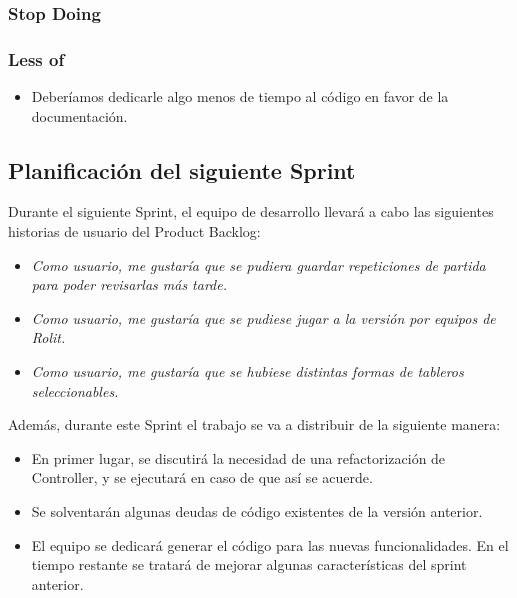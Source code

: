 \documentclass[../../FINAL/Scrum/SCRUM.tex]{subfiles}
\begin{document}
\subsubsection*{Stop Doing}


\subsubsection*{Less of}
\begin{itemize}
\item Deberíamos dedicarle algo menos de tiempo al código en favor de la documentación.
\end{itemize}

\subsection{Planificación del siguiente Sprint}
Durante el siguiente Sprint, el equipo de desarrollo llevará a cabo las siguientes historias de usuario del Product Backlog:
\begin{itemize}
\item \textit{Como usuario, me gustaría que se pudiera guardar repeticiones de partida para poder revisarlas más tarde.}
\item \textit{Como usuario, me gustaría que se pudiese jugar a la versión por equipos de Rolit.}
\item \textit{Como usuario, me gustaría que se hubiese distintas formas de tableros seleccionables.}
\end{itemize}
Además, durante este Sprint el trabajo se va a distribuir de la siguiente manera:
\begin{itemize}
\item En primer lugar, se discutirá la necesidad de una refactorización de Controller, y se ejecutará en caso de que así se acuerde.
\item Se solventarán algunas deudas de código existentes de la versión anterior.
\item El equipo se dedicará generar el código para las nuevas funcionalidades. En el tiempo restante se tratará de mejorar algunas características del sprint anterior.
\end{itemize}
\end{document}
